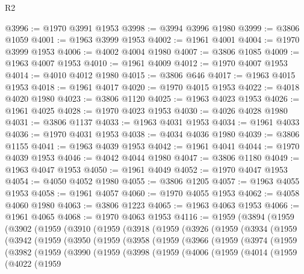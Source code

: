 \begin{lexlean}{R2}
\begin{coremodule}
@3996 := @1970 @3991 @1953
@3998 := @3994 @3996 @1980
@3999 := @3806 @1059
@4001 := @1963 @3999 @1953
@4002 := @1961 @4001
@4004 := @1970 @3999 @1953
@4006 := @4002 @4004 @1980
@4007 := @3806 @1085
@4009 := @1963 @4007 @1953
@4010 := @1961 @4009
@4012 := @1970 @4007 @1953
@4014 := @4010 @4012 @1980
@4015 := @3806 @646
@4017 := @1963 @4015 @1953
@4018 := @1961 @4017
@4020 := @1970 @4015 @1953
@4022 := @4018 @4020 @1980
@4023 := @3806 @1120
@4025 := @1963 @4023 @1953
@4026 := @1961 @4025
@4028 := @1970 @4023 @1953
@4030 := @4026 @4028 @1980
@4031 := @3806 @1137
@4033 := @1963 @4031 @1953
@4034 := @1961 @4033
@4036 := @1970 @4031 @1953
@4038 := @4034 @4036 @1980
@4039 := @3806 @1155
@4041 := @1963 @4039 @1953
@4042 := @1961 @4041
@4044 := @1970 @4039 @1953
@4046 := @4042 @4044 @1980
@4047 := @3806 @1180
@4049 := @1963 @4047 @1953
@4050 := @1961 @4049
@4052 := @1970 @4047 @1953
@4054 := @4050 @4052 @1980
@4055 := @3806 @1205
@4057 := @1963 @4055 @1953
@4058 := @1961 @4057
@4060 := @1970 @4055 @1953
@4062 := @4058 @4060 @1980
@4063 := @3806 @1223
@4065 := @1963 @4063 @1953
@4066 := @1961 @4065
@4068 := @1970 @4063 @1953
@4116 := @1959
    (@3894
      (@1959
        (@3902
          (@1959
            (@3910
              (@1959
                (@3918
                  (@1959
                    (@3926
                      (@1959
                        (@3934
                          (@1959
                            (@3942
                              (@1959
                                (@3950
                                  (@1959
                                    (@3958
                                      (@1959
                                        (@3966
                                          (@1959
                                            (@3974
                                              (@1959
                                                (@3982
                                                  (@1959
                                                    (@3990
                                                      (@1959
                                                        (@3998
                                                          (@1959
                                                            (@4006
                                                              (@1959
                                                                (@4014
                                                                  (@1959
                                                                    (@4022
                                                                      (@1959

\end{coremodule}
\end{lexlean}
